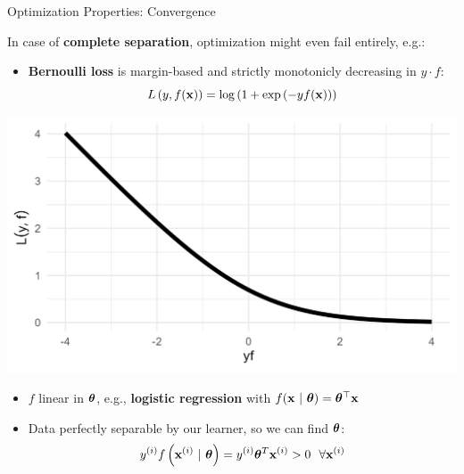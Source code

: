 \documentclass[11pt,compress,t,notes=noshow, xcolor=table]{beamer}
\begin{document}
\begin{vbframe}{Optimization Properties: Convergence}

\footnotesize

In case of \textbf{complete separation}, optimization might even 
fail entirely, e.g.:

\vspace{0.5cm}

\begin{minipage}{0.7\textwidth}
  \begin{itemize}
    \item \textbf{Bernoulli loss} is margin-based and strictly monotonicly decreasing in
    $y \cdot f$: 
    $$L\left(y, f(\mathbf{x})\right) = \log \left( 1 + \exp \left( - y  f(\mathbf{x}) \right)\right)$$
  \end{itemize}
\end{minipage}%
\begin{minipage}{0.05\textwidth}
  \phantom{foo}
\end{minipage}%
\begin{minipage}{0.25\textwidth}
  \includegraphics[width=\textwidth]{figure/bernoulli.png}
\end{minipage}%

\begin{itemize}
  \item $f$ linear in $\bm{\theta}$, e.g.,
  \textbf{logistic regression} with $f(\mathbf{x} ~|~ \bm{\theta}) = \bm{\theta}^\top \mathbf{x}$
  \item Data perfectly separable by our learner, so we can find $\bm{\theta}$:
   $$ y^{(i)} f\left(\mathbf{x}^{(i)} ~|~ \bm{\theta}\right) = y^{(i)} \bm{\theta}^T \mathbf{x}^{(i)} > 0 ~~ \forall \mathbf{x}^{(i)}$$


\end{itemize}
\end{vbframe}
\end{document}
